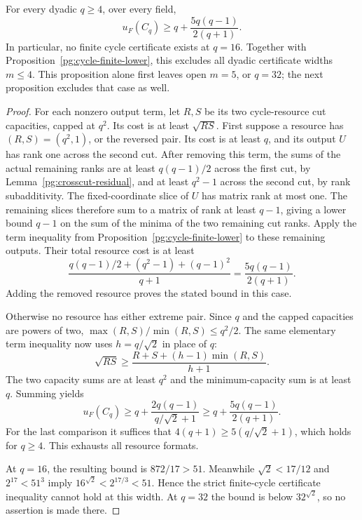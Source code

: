 \begin{proposition}
\label{pg:cycle-dyadic-lower}
For every dyadic $q\geq4$, over every field,
\[
 u_F(C_q)\geq q+\frac{5q(q-1)}{2(q+1)}.
 \tag{PG-CYCLE-dyadic-lower}
\]
In particular, no finite cycle certificate exists at $q=16$.
Together with Proposition~\ref{pg:cycle-finite-lower}, this excludes
all dyadic certificate widths $m\leq4$. This proposition alone first leaves open $m=5$, or $q=32$;
the next proposition excludes that case as well.
\end{proposition}
\begin{proof}
For each nonzero output term, let $R,S$ be its two cycle-resource
cut capacities, capped at $q^2$. Its cost is at least $\sqrt{RS}$.
First suppose a resource has $(R,S)=(q^2,1)$, or the reversed
pair. Its cost is at least $q$, and its output $U$ has rank one
across the second cut. After removing this term, the sums of the
actual remaining ranks are at least $q(q-1)/2$ across the first
cut, by Lemma~\ref{pg:crosscut-residual}, and at least $q^2-1$
across the second cut, by rank subadditivity. The fixed-coordinate
slice of $U$ has matrix rank at most one. The remaining slices
therefore sum to a matrix of rank at least $q-1$, giving a lower
bound $q-1$ on the sum of the minima of the two remaining cut
ranks. Apply the term inequality from
Proposition~\ref{pg:cycle-finite-lower} to these remaining
outputs. Their total resource cost is at least
\[
 \frac{q(q-1)/2+(q^2-1)+(q-1)^2}{q+1}
 =\frac{5q(q-1)}{2(q+1)}.
\]
Adding the removed resource proves the stated bound in this case.

Otherwise no resource has either extreme pair. Since $q$ and
the capped capacities are powers of two,
$\max(R,S)/\min(R,S)\leq q^2/2$.
The same elementary term inequality now uses
$h=q/\sqrt2$ in place of $q$:
\[
 \sqrt{RS}\geq\frac{R+S+(h-1)\min(R,S)}{h+1}.
\]
The two capacity sums are at least $q^2$ and the minimum-capacity
sum is at least $q$. Summing yields
\[
 u_F(C_q)\geq q+\frac{2q(q-1)}{q/\sqrt2+1}
 \geq q+\frac{5q(q-1)}{2(q+1)}.
\]
For the last comparison it suffices that
$4(q+1)\geq5(q/\sqrt2+1)$, which holds for $q\geq4$.
This exhausts all resource formats.

At $q=16$, the resulting bound is $872/17>51$.
Meanwhile $\sqrt2<17/12$ and $2^{17}<51^3$ imply
$16^{\sqrt2}<2^{17/3}<51$. Hence the strict finite-cycle
certificate inequality cannot hold at this width. At $q=32$
the bound is below $32^{\sqrt2}$, so no assertion is made there.
\end{proof}

